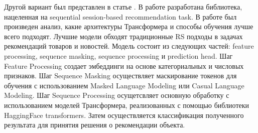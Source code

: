 Другой вариант был представлен в статье \cite{transformers4rec}. В работе разработана библиотека, нацеленная на sequential session-based recommendation task. В работе был произведен анализ, какие архитектуры Трансформера и способы обучения лучше всего подходят. Лучшие модели обходят традиционные RS подходы в задачах рекомендаций товаров и новостей. Модель состоит из следующих частей: feature processing, sequence masking, sequence processing и prediction head. Шаг Feature Processing создает эмбеддинги на основе категориальных и числовых признаков. Шаг Sequence Masking осуществляет маскирование токенов для обучения с использованием Masked Language Modeling или Casual Language Modeling. Шаг Sequence Processing осущетсвляет основную обработку с использованием моделей Трансформера, реализованных с помощью библиотеки HaggingFace transformers. Затем осуществляется классификация полученного результата для принятия решения о рекомендации объекта.
